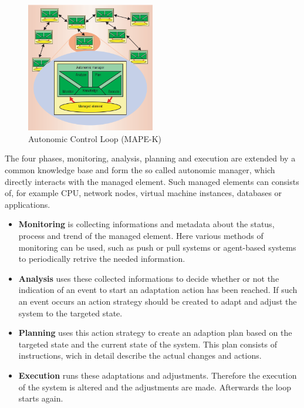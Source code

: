 \begin{figure}[ht]
\begin{center}
\includegraphics[width=0.5\textwidth]{chapters/chapter4/fig/mape2.png}
\end{center}
\caption{Autonomic Control Loop (MAPE-K)  \cite{kephart2003vision}}
\label{fig:SLA_Structure}
\end{figure}

The four phases, monitoring, analysis, planning and execution are extended by a common knowledge base and form the so called autonomic manager, which directly interacts with the managed element. Such managed elements can consists of, for example CPU, network nodes, virtual machine instances, databases or applications. 

\begin{itemize} 
\item \textbf{Monitoring} is collecting informations and metadata about the status, process and trend of the managed element. Here 
various methods of monitoring can be used, such as push or pull systems or agent-based systems to periodically retrive the needed information.  
\item \textbf{Analysis} uses these collected informations to decide whether or not the indication of an event to start an adaptation action has been reached. If such an event occurs an action strategy should be created to adapt and adjust the system to the targeted state.
\item \textbf{Planning} uses this action strategy to create an adaption plan based on the targeted state and the current state of the system. This plan consists of instructions, wich in detail describe the actual changes and actions.
\item \textbf{Execution} runs these adaptations and adjustments. Therefore the execution of the system is altered and the adjustments are made. Afterwards the loop starts again.
\end{itemize} 

